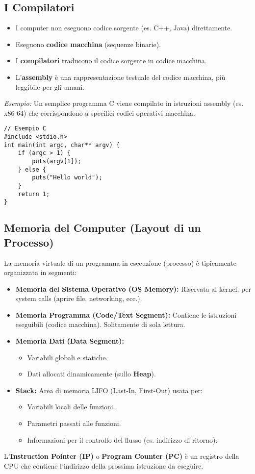 \documentclass{article}
\begin{document}
\subsection{I Compilatori}
\begin{itemize}
    \item I computer non eseguono codice sorgente (es. C++, Java) direttamente.
    \item Eseguono \textbf{codice macchina} (sequenze binarie).
    \item I \textbf{compilatori} traducono il codice sorgente in codice macchina.
    \item L'\textbf{assembly} è una rappresentazione testuale del codice macchina, più leggibile per gli umani.
\end{itemize}
\textit{Esempio:} Un semplice programma C viene compilato in istruzioni assembly (es. x86-64) che corrispondono a specifici codici operativi macchina.

\begin{verbatim}
// Esempio C
#include <stdio.h>
int main(int argc, char** argv) {
    if (argc > 1) {
        puts(argv[1]);
    } else {
        puts("Hello world");
    }
    return 1;
}
\end{verbatim}

\subsection{Memoria del Computer (Layout di un Processo)}
La memoria virtuale di un programma in esecuzione (processo) è tipicamente organizzata in segmenti:
\begin{itemize}
    \item \textbf{Memoria del Sistema Operativo (OS Memory):} Riservata al kernel, per system calls (aprire file, networking, ecc.).
    \item \textbf{Memoria Programma (Code/Text Segment):} Contiene le istruzioni eseguibili (codice macchina). Solitamente di sola lettura.
    \item \textbf{Memoria Dati (Data Segment):}
        \begin{itemize}
            \item Variabili globali e statiche.
            \item Dati allocati dinamicamente (sullo \textbf{Heap}).
        \end{itemize}
    \item \textbf{Stack:} Area di memoria LIFO (Last-In, First-Out) usata per:
        \begin{itemize}
            \item Variabili locali delle funzioni.
            \item Parametri passati alle funzioni.
            \item Informazioni per il controllo del flusso (es. indirizzo di ritorno).
        \end{itemize}
\end{itemize}
L'\textbf{Instruction Pointer (IP)} o \textbf{Program Counter (PC)} è un registro della CPU che contiene l'indirizzo della prossima istruzione da eseguire.
\end{document}
